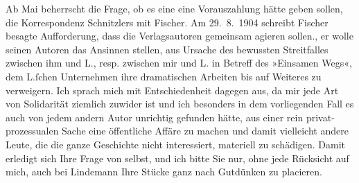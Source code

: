 \begin{ledgroupsized}[t]{13cm}
{{{                  Ab Mai beherrscht die Frage, ob es eine eine Vorauszahlung hätte
                  geben sollen, die Korrespondenz Schnitzlers mit
                     Fischer. Am 29. 8. 1904
                  schreibt Fischer besagte Aufforderung, dass
                  die Verlagsautoren gemeinsam agieren sollen.}}}\label{K_L01455_1h}, er wolle seinen Autoren das
               Ansinnen stellen, aus Ursache des bewussten Streitfalles zwischen ihm und L., resp. zwischen mir und L. in Betreff des »Einsamen
                  Wegs«, \introOben{}dem L.ſchen
                  Unternehmen\introOben{} ihre dramatischen Arbeiten bis auf Weiteres zu verweigern. Ich
               sprach mich mit Entschiedenheit dagegen aus, da mir jede Art von Solidarität ziemlich
               zuwider ist und ich besonders in dem vorliegenden Fall es auch von jedem andern Autor
               unrichtig gefunden hätte, aus einer rein \introOben{}privat-\introOben{}prozessualen Sache eine \introOben{}öffentliche\introOben{} Affäre zu
               machen und damit vielleicht  andere Leute, die
               die ganze Geschichte nicht interessiert, materiell zu schädigen. Damit erledigt sich
               Ihre Frage von selbst, und ich bit{\pb}te Sie nur, ohne jede
               Rücksicht auf mich, auch bei Lindemann Ihre
               Stücke ganz nach Gutdünken zu placieren.\pend

\end{ledgroupsized}
